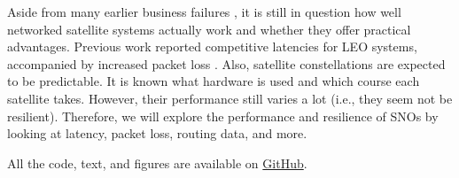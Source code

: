Aside from many earlier business failures \cite{Chan2002, Barboza2000}, it is
still in question how well networked satellite systems actually work and
whether they offer practical advantages. Previous work reported competitive
latencies for \ac{LEO} systems, accompanied by increased packet loss
\cite{DBLP:conf/imc/MichelTGB22}. Also, satellite constellations are expected
to be predictable. It is known what hardware is used and which course each
satellite takes. However, their performance still varies a lot (i.e., they seem
not be resilient). Therefore, we will explore the performance and resilience of
\ac{SNO}s by looking at latency, packet loss, routing data, and more.

All the code, text, and figures are available on
\href{https://github.com/starlink-thesis-diic/starlink-thesis}{GitHub}.
